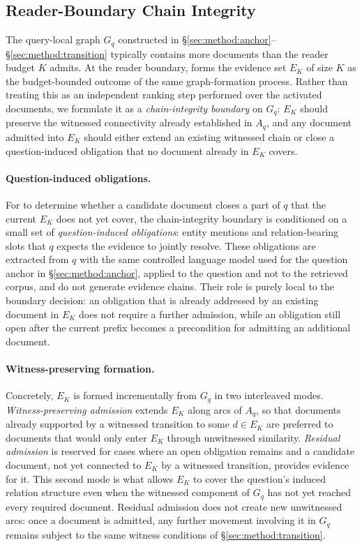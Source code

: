 \subsection{Reader-Boundary Chain Integrity}
\label{sec:method:boundary}

The query-local graph $G_q$ constructed in
\S\ref{sec:method:anchor}--\S\ref{sec:method:transition} typically contains
more documents than the reader budget $K$ admits. At the reader boundary,
\methodname{} forms the evidence set $E_K$ of size $K$ as the
budget-bounded outcome of the same graph-formation process. Rather than
treating this as an independent ranking step performed over the activated
documents, we formulate it as a \emph{chain-integrity boundary} on $G_q$:
$E_K$ should preserve the witnessed connectivity already established in
$A_q$, and any document admitted into $E_K$ should either extend an
existing witnessed chain or close a question-induced obligation that no
document already in $E_K$ covers.

\paragraph{Question-induced obligations.}
For \methodname{} to determine whether a candidate document closes a part
of $q$ that the current $E_K$ does not yet cover, the chain-integrity
boundary is conditioned on a small set of \emph{question-induced
obligations}: entity mentions and relation-bearing slots that $q$ expects
the evidence to jointly resolve. These obligations are extracted from $q$
with the same controlled language model used for the question anchor in
\S\ref{sec:method:anchor}, applied to the question and not to the
retrieved corpus, and do not generate evidence chains. Their role is
purely local to the boundary decision: an obligation that is already
addressed by an existing document in $E_K$ does not require a further
admission, while an obligation still open after the current prefix
becomes a precondition for admitting an additional document.

\paragraph{Witness-preserving formation.}
Concretely, $E_K$ is formed incrementally from $G_q$ in two interleaved
modes. \emph{Witness-preserving admission} extends $E_K$ along arcs of
$A_q$, so that documents already supported by a witnessed transition to
some $d \in E_K$ are preferred to documents that would only enter $E_K$
through unwitnessed similarity. \emph{Residual admission} is reserved for
cases where an open obligation remains and a candidate document, not yet
connected to $E_K$ by a witnessed transition, provides evidence for it.
This second mode is what allows $E_K$ to cover the question's induced
relation structure even when the witnessed component of $G_q$ has not yet
reached every required document. Residual admission does not create new
unwitnessed arcs: once a document is admitted, any further movement
involving it in $G_q$ remains subject to the same witness conditions of
\S\ref{sec:method:transition}.

